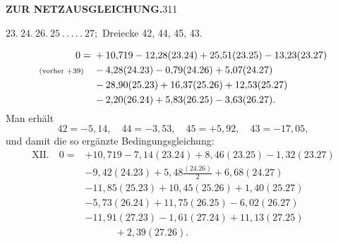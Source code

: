 \newpage
\noindent\textbf{ZUR NETZAUSGLEICHUNG.}\hfill311
\begin{center}
$23.\ 24.\ 26.\ 25\ .\,.\,.\,.\,.\ 27;$ Dreiecke 42, 44, 45, 43.
\end{center}
\[
\begin{aligned}
0={}&+10{,}719-12{,}28(23.24)+25{,}51(23.25)-13{,}23(23.27)\\
\text{\scriptsize(vorher $+39$)}\quad&-4{,}28(24.23)-0{,}79(24.26)+5{,}07(24.27)\\
&-28{,}90(25.23)+16{,}37(25.26)+12{,}53(25.27)\\
&-2{,}20(26.24)+5{,}83(26.25)-3{,}63(26.27).
\end{aligned}
\]
Man erhält
\[
42=-5{,}14,\quad44=-3{,}53,\quad45=+5{,}92,\quad43=-17{,}05,
\]
und damit die so ergänzte Bedingungsgleichung:
\[
\begin{aligned}
\mathrm{XII.}\quad0={}&+10{,}719-7{,}14(23.24)+8{,}46(23.25)-1{,}32(23.27)\\
&-9{,}42(24.23)+5{,}48\frac{(24.26)}{2}+6{,}68(24.27)\\
&-11{,}85(25.23)+10{,}45(25.26)+1{,}40(25.27)\\
&-5{,}73(26.24)+11{,}75(26.25)-6{,}02(26.27)\\
&-11{,}91(27.23)-1{,}61(27.24)+11{,}13(27.25)\\
&\qquad\quad+2{,}39(27.26).
\end{aligned}
\]
